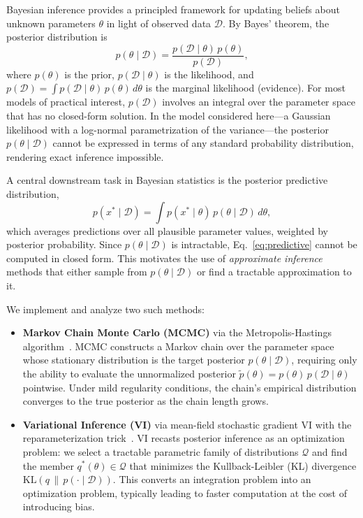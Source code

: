 \documentclass[12pt,a4paper]{article}
\newcommand{\D}{\mathcal{D}}
\newcommand{\pt}{\tilde{p}}
\newcommand{\KL}{\mathrm{KL}}
\begin{document}
Bayesian inference provides a principled framework for updating beliefs about
unknown parameters $\theta$ in light of observed data $\D$.
By Bayes' theorem, the posterior distribution is
\begin{equation}
  p(\theta \mid \D) = \frac{p(\D \mid \theta)\,p(\theta)}{p(\D)},
  \label{eq:bayes}
\end{equation}
where $p(\theta)$ is the prior, $p(\D \mid \theta)$ is the likelihood,
and $p(\D) = \int p(\D \mid \theta)\,p(\theta)\,d\theta$ is the marginal
likelihood (evidence).
For most models of practical interest, $p(\D)$ involves an integral over the
parameter space that has no closed-form solution.
In the model considered here---a Gaussian likelihood with a
log-normal parametrization of the variance---the posterior
$p(\theta \mid \D)$ cannot be expressed in terms of any standard
probability distribution, rendering exact inference impossible.

A central downstream task in Bayesian statistics is the posterior
predictive distribution,
\begin{equation}
  p(x^* \mid \D) = \int p(x^* \mid \theta)\,p(\theta \mid \D)\,d\theta,
  \label{eq:predictive}
\end{equation}
which averages predictions over all plausible parameter values, weighted
by posterior probability.
Since $p(\theta \mid \D)$ is intractable, Eq.~\eqref{eq:predictive}
cannot be computed in closed form.
This motivates the use of \emph{approximate inference} methods that either
sample from $p(\theta \mid \D)$ or find a tractable approximation to it.

We implement and analyze two such methods:
\begin{itemize}
  \item \textbf{Markov Chain Monte Carlo (MCMC)} via the
  Metropolis-Hastings algorithm~\citep{metropolis1953equation,hastings1970monte}.
  MCMC constructs a Markov chain over the parameter space whose stationary
  distribution is the target posterior $p(\theta \mid \D)$, requiring
  only the ability to evaluate the unnormalized posterior
  $\pt(\theta) = p(\theta)\,p(\D \mid \theta)$ pointwise.
  Under mild regularity conditions, the chain's empirical distribution
  converges to the true posterior as the chain length grows.

  \item \textbf{Variational Inference (VI)} via mean-field stochastic
  gradient VI with the reparameterization
  trick~\citep{jordan1999introduction,kingma2013auto,rezende2014stochastic}.
  VI recasts posterior inference as an optimization problem: we select
  a tractable parametric family of distributions $\mathcal{Q}$ and
  find the member $q^*(\theta) \in \mathcal{Q}$ that minimizes the
  Kullback-Leibler (KL) divergence $\KL(q\,\|\,p(\cdot \mid \D))$.
  This converts an integration problem into an optimization problem,
  typically leading to faster computation at the cost of introducing bias.
\end{itemize}
\end{document}
